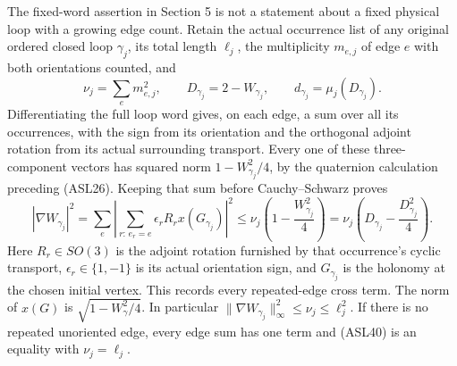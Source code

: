 \documentclass[11pt]{article}
\begin{document}
The fixed-word assertion in Section 5 is not a statement about a fixed physical loop with a growing edge count. Retain the actual occurrence list of any original ordered closed loop \(\gamma_j\), its total length \(\ell_j\), the multiplicity \(m_{e,j}\) of edge \(e\) with both orientations counted, and
\[
 \nu_j=\sum_em_{e,j}^2,\qquad
 D_{\gamma_j}=2-W_{\gamma_j},\qquad
 d_{\gamma_j}=\mu_j(D_{\gamma_j}).
 \tag{ASL39}
\]
Differentiating the full loop word gives, on each edge, a sum over all its occurrences, with the sign from its orientation and the orthogonal adjoint rotation from its actual surrounding transport. Every one of these three-component vectors has squared norm \(1-W_{\gamma_j}^2/4\), by the quaternion calculation preceding (ASL26). Keeping that sum before Cauchy–Schwarz proves
\[
 |\nabla W_{\gamma_j}|^2
 =\sum_e\left|\sum_{r:\,e_r=e}\epsilon_r R_r x(G_{\gamma_j})\right|^2
 \le\nu_j\left(1-\frac{W_{\gamma_j}^2}{4}\right)
 =\nu_j\left(D_{\gamma_j}-\frac{D_{\gamma_j}^2}{4}\right).
 \tag{ASL40}
\]
Here \(R_r\in SO(3)\) is the adjoint rotation furnished by that occurrence's cyclic transport, \(\epsilon_r\in\{1,-1\}\) is its actual orientation sign, and \(G_{\gamma_j}\) is the holonomy at the chosen initial vertex. This records every repeated-edge cross term. The norm of \(x(G)\) is \(\sqrt{1-W_\gamma^2/4}\). In particular \(\|\nabla W_{\gamma_j}\|_\infty^2\le\nu_j\le\ell_j^2\). If there is no repeated unoriented edge, every edge sum has one term and (ASL40) is an equality with \(\nu_j=\ell_j\).
\end{document}
